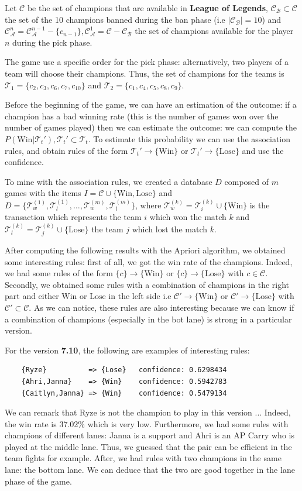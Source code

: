 \documentclass{article}
\def\lol{\textbf{League of Legends}}
\def\version{\textbf{7.10}}
\def\champion{\mathcal{C}}
\def\ban{\champion_\mathcal{B}}
\def\available#1{\champion_\mathcal{A}^{#1}}
\def\team#1{\mathcal{T}_{#1}}
\def\win{\text{Win}}
\def\lose{\text{Lose}}
\def\rules#1#2{#1 \rightarrow #2}
\def\items{I}
\def\database{D}
\begin{document}
Let $\champion$ be the set of champions that are available in \lol, $\ban \subset \champion$ the set of the 10 champions banned during the ban phase (i.e $|\ban|=10$) and $\available{n} = \available{n-1}-\{c_{n-1}\}, \available{1} = \champion-\ban$ the set of champions available for the player $n$ during the pick phase.

The game use a specific order for the pick phase: alternatively, two players of a team will choose their champions. Thus, the set of champions for the teams is $\team{1} = \{c_2, c_3, c_6, c_7, c_{10}\}$ and $\team{2} = \{c_1, c_4, c_5, c_8, c_9\}$.

Before the beginning of the game, we can have an estimation of the outcome: if a champion has a bad winning rate (this is the number of games won over the number of games played) then we can estimate the outcome: we can compute the $P(\win|\team{t}'), \team{t}'\subset \team{t}$. To estimate this probability we can use the association rules, and obtain rules of the form $\rules{\team{t}'}{\{\win\}}$ or $\rules{\team{t}'}{\{\lose\}}$ and use the confidence.

To mine with the association rules, we created a database $\database$ composed of $m$ games with the items $\items=\champion\cup\{\win,\lose\}$ and $\database = \{\team{w}^{(1)}, \team{l}^{(1)},\dots, \team{w}^{(m)}, \team{l}^{(m)}\}$, where $\team{w}^{(k)}=\team{i}^{(k)}\cup\{\win\}$ is the transaction which represents the team $i$ which won the match $k$ and $\team{l}^{(k)}=\team{j}^{(k)}\cup\{\lose\}$ the team $j$ which lost the match $k$. 

After computing the following results with the Apriori algorithm, we obtained some interesting rules: first of all, we got the win rate of the champions. Indeed, we had some rules of the form $\rules{\{c\}}{\{\win\}}$ or $\rules{\{c\}}{\{\lose\}}$ with $c\in\champion$. Secondly, we obtained some rules with a combination of champions in the right part and either $\win$ or $\lose$ in the left side i.e $\rules{\champion'}{\{\win\}}$ or $\rules{\champion'}{\{\lose\}}$ with $\champion'\subset\champion$. As we can notice, these rules are also interesting because we can know if a combination of champions (especially in the bot lane) is strong in a particular version.

For the version \version, the following are examples of interesting rules:
\begin{verbatim}
    {Ryze}          => {Lose}   confidence: 0.6298434
    {Ahri,Janna}    => {Win}    confidence: 0.5942783
    {Caitlyn,Janna} => {Win}    confidence: 0.5479134
\end{verbatim}
We can remark that Ryze is not the champion to play in this version ... Indeed, the win rate is 37.02\% which is very low.
Furthermore, we had some rules with champions of different lanes: Janna is a support and Ahri is an AP Carry who is played at the middle lane. Thus, we guessed that the pair can be efficient in the team fights for example. After, we had rules with two champions in the same lane: the bottom lane. We can deduce that the two are good together in the lane phase of the game.
\end{document}
